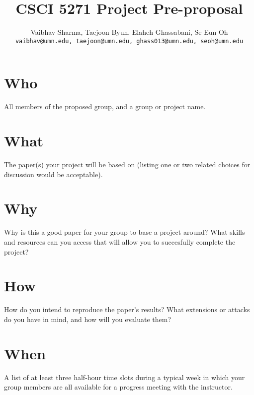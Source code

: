 \documentclass{article}
\title{CSCI 5271 Project Pre-proposal}
\author{Vaibhav Sharma, Taejoon Byun, Elaheh Ghassabani, Se Eun Oh\\
\texttt{vaibhav@umn.edu, taejoon@umn.edu, ghass013@umn.edu, seoh@umn.edu}\\
}
\begin{document}
\maketitle


\section{Who}
All members of the proposed group, and a group or project name.

\section{What}
The paper(s) your project will be based on (listing one or two related choices for discussion would be acceptable).

\section{Why}
Why is this a good paper for your group to base a project around? What skills and resources can you access that will allow you to succesfully complete the project?

\section{How}
How do you intend to reproduce the paper's results? What extensions or attacks do you have in mind, and how will you evaluate them?

\section{When}
A list of at least three half-hour time slots during a typical week in which your group members are all available for a progress meeting with the instructor.
\end{document}

